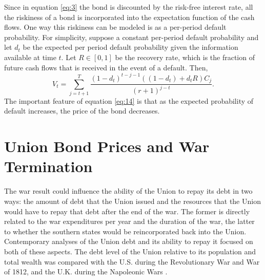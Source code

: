 \documentclass[11pt, oneside, article]{memoir}
\begin{document}
Since in equation \eqref{eq:3} the bond is discounted by the risk-free interest rate, all the riskiness of a bond is incorporated into the expectation function of the cash flows.
One way this riskiness can be modeled is as a per-period default probability.
For simplicity, suppose a constant per-period default probability and let $d_{t}$ be the expected per period default probability given the information available at time $t$.
Let $R \in [0, 1]$ be the recovery rate, which is the fraction of future cash flows that is received in the event of a default.
Then,
\begin{equation}
  \label{eq:14}
  V_{t} = \sum_{j = t + 1}^{T} \frac{(1 - d_{t})^{t - j - 1}((1 - d_{t}) + d_{t} R) C_{j}}{(r + 1)^{j - t}} \text{.}
\end{equation}
The important feature of equation \eqref{eq:14} is that as the expected probability of default increases, the price of the bond decreases.

\section{Union Bond Prices and War Termination}
\label{sec:war-prob-union}

The war result could influence the ability of the Union to repay its debt in two ways: the amount of debt that the Union issued and the resources that the Union would have to repay that debt after the end of the war.
The former is directly related to the war expenditures per year and the duration of the war, the latter to whether the southern states would be reincorporated back into the Union.
Contemporary analyses of the Union debt and its ability to repay it focused on both of these aspects. 
The debt level of the Union relative to its population and total wealth was compared with the U.S. during the Revolutionary War and War of 1812, and the U.K. during the Napoleonic Wars \parencites{elder1863debt}{Treasury1865}.
\end{document}
